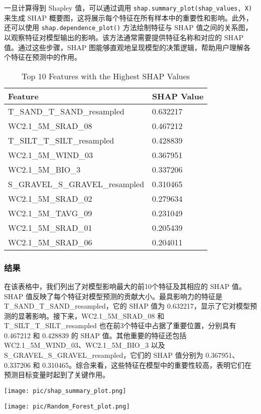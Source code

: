 \documentclass{article}
\begin{document}
一旦计算得到 Shapley 值，可以通过调用 \texttt{shap.summary\_plot(shap\_values, X)} 来生成 SHAP 概要图，这将展示每个特征在所有样本中的重要性和影响。此外，还可以使用 \texttt{shap.dependence\_plot()} 方法绘制特征与 SHAP 值之间的关系图，以观察特征对模型输出的影响。该方法通常需要提供特征名称和对应的 SHAP 值。通过这些步骤，SHAP 图能够直观地呈现模型的决策逻辑，帮助用户理解各个特征在预测中的作用。



\begin{table}[h!]
	\centering
	\begin{tabular}{|l|l|}
		\hline
		\textbf{Feature} & \textbf{SHAP Value} \\ \hline
		T\_SAND\_T\_SAND\_resampled & 0.632217 \\ \hline
		WC2.1\_5M\_SRAD\_08 & 0.467212 \\ \hline
		T\_SILT\_T\_SILT\_resampled & 0.428839 \\ \hline
		WC2.1\_5M\_WIND\_03 & 0.367951 \\ \hline
		WC2.1\_5M\_BIO\_3 & 0.337206 \\ \hline
		S\_GRAVEL\_S\_GRAVEL\_resampled & 0.310465 \\ \hline
		WC2.1\_5M\_SRAD\_02 & 0.279634 \\ \hline
		WC2.1\_5M\_TAVG\_09 & 0.231049 \\ \hline
		WC2.1\_5M\_SRAD\_01 & 0.205439 \\ \hline
		WC2.1\_5M\_SRAD\_06 & 0.204011 \\ \hline
	\end{tabular}
	\caption{Top 10 Features with the Highest SHAP Values}
\end{table}


\subsubsection{结果}
在该表格中，我们列出了对模型影响最大的前10个特征及其相应的 SHAP 值。SHAP 值反映了每个特征对模型预测的贡献大小。最具影响力的特征是 T\_SAND\_T\_SAND\_resampled，它的 SHAP 值为 0.632217，显示了它对模型预测的显著影响。接下来，WC2.1\_5M\_SRAD\_08 和 T\_SILT\_T\_SILT\_resampled 也在前3个特征中占据了重要位置，分别具有 0.467212 和 0.428839 的 SHAP 值。其他重要的特征还包括 WC2.1\_5M\_WIND\_03、WC2.1\_5M\_BIO\_3 以及 S\_GRAVEL\_S\_GRAVEL\_resampled，它们的 SHAP 值分别为 0.367951、0.337206 和 0.310465。综合来看，这些特征在模型中的重要性较高，表明它们在预测目标变量时起到了关键作用。

\par
\texttt{[image: pic/shap\_summary\_plot.png]} %
\par
\texttt{[image: pic/Random\_Forest\_plot.png]} %
\end{document}
